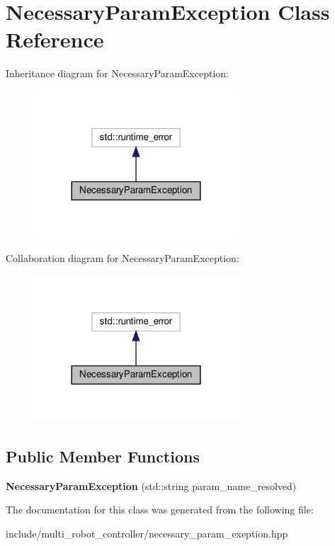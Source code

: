\hypertarget{classNecessaryParamException}{}\section{Necessary\+Param\+Exception Class Reference}
\label{classNecessaryParamException}


Inheritance diagram for Necessary\+Param\+Exception\+:\nopagebreak
\begin{figure}[H]
\begin{center}
\leavevmode
\includegraphics[width=216pt]{da/da3/classNecessaryParamException__inherit__graph}
\end{center}
\end{figure}


Collaboration diagram for Necessary\+Param\+Exception\+:\nopagebreak
\begin{figure}[H]
\begin{center}
\leavevmode
\includegraphics[width=216pt]{db/d93/classNecessaryParamException__coll__graph}
\end{center}
\end{figure}
\subsection*{Public Member Functions}
\begin{DoxyCompactItemize}
\item 
{\bfseries Necessary\+Param\+Exception} (std\+::string param\+\_\+name\+\_\+resolved)
\end{DoxyCompactItemize}


The documentation for this class was generated from the following file\+:\begin{DoxyCompactItemize}
\item 
include/multi\+\_\+robot\+\_\+controller/necessary\+\_\+param\+\_\+exeption.\+hpp\end{DoxyCompactItemize}
